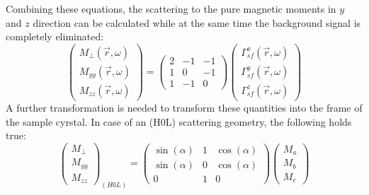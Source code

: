 %
Combining these equations, the scattering to the pure magnetic moments in $y$
and $z$ direction can be calculated while at the same time the background
signal is completely eliminated:
%
\begin{equation}
  \begin{pmatrix} 
    M_{\perp}(\vec{r},\omega) \\
    M_{yy}(\vec{r},\omega) \\ 
    M_{zz}(\vec{r},\omega) 
  \end{pmatrix} 
  =
  \begin{pmatrix} 
    2 & -1 & -1 \\ 
    1 & 0 & -1 \\ 
    1 & -1 & 0 
  \end{pmatrix}
  \begin{pmatrix} 
    \Gamma_{sf}^x (\vec{r},\omega)  \\
    \Gamma_{sf}^y(\vec{r},\omega) \\
    \Gamma_{sf}^z (\vec{r},\omega)
  \end{pmatrix}
\end{equation}
%
A further transformation is needed to
transform these quantities into the frame of the sample cyrstal. In case of an
(H0L) scattering geometry, the following holds true:
%
\begin{equation} 
  \begin{pmatrix} M_{\perp} \\ 
    M_{yy} \\ 
    M_{zz}
  \end{pmatrix}_{(H0L)} 
  = 
  \begin{pmatrix} 
    \sin(\alpha)  & 1 & \cos(\alpha) \\
    \sin(\alpha)  & 0 & \cos(\alpha) \\ 
    0 & 1 & 0 
  \end{pmatrix} 
  \begin{pmatrix}
    M_a \\ M_b \\ M_c 
  \end{pmatrix} 
\end{equation}
